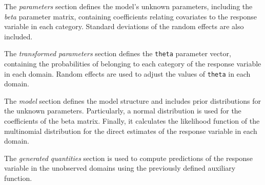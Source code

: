 \documentclass[
  12pt,
]{book}
\begin{document}
The \emph{parameters} section defines the model's unknown parameters, including the \emph{beta} parameter matrix, containing coefficients relating covariates to the response variable in each category. Standard deviations of the random effects are also included.

The \emph{transformed parameters} section defines the \texttt{theta} parameter vector, containing the probabilities of belonging to each category of the response variable in each domain. Random effects are used to adjust the values of \texttt{theta} in each domain.

The \emph{model} section defines the model structure and includes prior distributions for the unknown parameters. Particularly, a normal distribution is used for the coefficients of the beta matrix. Finally, it calculates the likelihood function of the multinomial distribution for the direct estimates of the response variable in each domain.

The \emph{generated quantities} section is used to compute predictions of the response variable in the unobserved domains using the previously defined auxiliary function.
\end{document}

